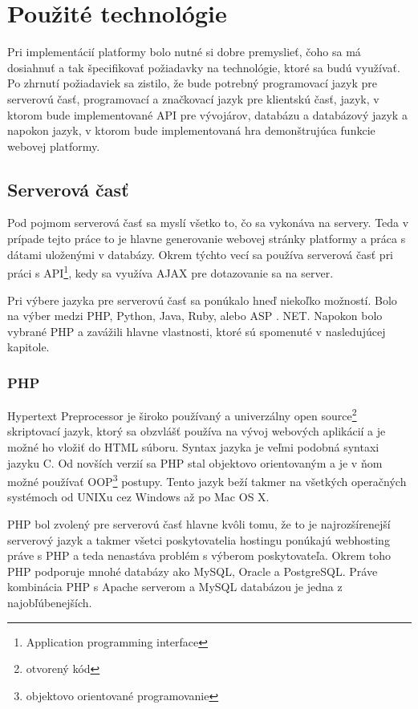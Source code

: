 
\chapter{Použité technológie}
\label{chap:technologie}
Pri implementácií platformy bolo nutné si dobre premyslieť, čoho sa má dosiahnuť a tak špecifikovať požiadavky na technológie, ktoré sa budú využívať. Po zhrnutí požiadaviek sa zistilo, že bude potrebný programovací jazyk pre serverovú časť, programovací a značkovací jazyk pre klientskú časť, jazyk, v ktorom bude implementované API pre vývojárov, databázu a databázový jazyk a napokon jazyk, v ktorom bude implementovaná hra demonštrujúca funkcie webovej platformy.

\section{Serverová časť}
\label{sec:server}
Pod pojmom serverová časť sa myslí všetko to, čo sa vykonáva na servery. Teda v prípade tejto práce to je hlavne generovanie webovej stránky platformy a práca s dátami uloženými v databázy. Okrem týchto vecí sa používa serverová časť pri práci s API\footnote{Application programming interface}, kedy sa využíva AJAX pre dotazovanie sa na server.

Pri výbere jazyka pre serverovú časť sa ponúkalo hneď niekoľko možností. Bolo na výber medzi PHP, Python, Java, Ruby, alebo ASP . NET. Napokon bolo vybrané PHP a zavážili hlavne vlastnosti, ktoré sú spomenuté v nasledujúcej kapitole.

\subsection{PHP}
\label{sec:php}
Hypertext Preprocessor je široko používaný a univerzálny open source\footnote{otvorený kód} skriptovací jazyk, ktorý sa obzvlášť používa na vývoj webových aplikácií a je možné ho vložiť do HTML súboru. Syntax jazyka je veľmi podobná syntaxi jazyku C. Od novších verzií sa PHP stal objektovo orientovaným a je v ňom možné používať OOP\footnote{objektovo orientované programovanie} postupy. Tento jazyk beží takmer na všetkých operačných systémoch od UNIXu cez Windows až po Mac OS X. \cite{w3-php}

PHP bol zvolený pre serverovú časť hlavne kvôli tomu, že to je najrozšírenejší serverový jazyk a takmer všetci poskytovatelia hostingu ponúkajú webhosting práve s PHP a teda nenastáva problém s výberom poskytovateľa. Okrem toho PHP podporuje mnohé databázy ako MySQL, Oracle a PostgreSQL. Práve kombinácia PHP s Apache serverom a MySQL databázou je jedna z najobľúbenejších. 


